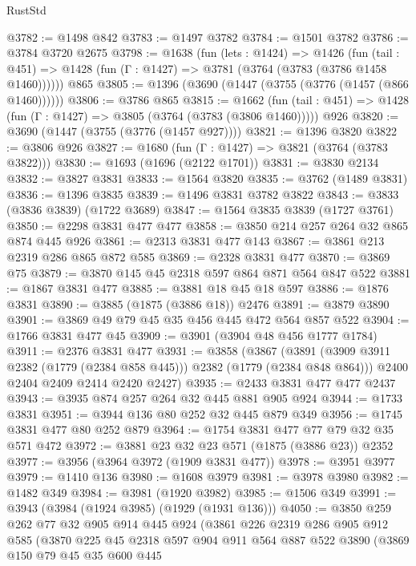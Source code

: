 \begin{lexlean}{RustStd}
\begin{coremodule}
{\begin{coremodule}
{{{{{{{{{{{@3782 := @1498 @842
@3783 := @1497 @3782
@3784 := @1501 @3782
@3786 := @3784 @3720 @2675
@3798 := @1638
    (fun (lets : @1424) =>
    @1426
      (fun (tail : @451) => @1428 (fun (Γ : @1427) => @3781 (@3764 (@3783 (@3786 @1458 @1460))))))
    @865
@3805 := @1396 (@3690 (@1447 (@3755 (@3776 (@1457 (@866 @1460))))))
@3806 := @3786 @865
@3815 := @1662
    (fun (tail : @451) => @1428 (fun (Γ : @1427) => @3805 (@3764 (@3783 (@3806 @1460)))))
    @926
@3820 := @3690 (@1447 (@3755 (@3776 (@1457 @927))))
@3821 := @1396 @3820
@3822 := @3806 @926
@3827 := @1680 (fun (Γ : @1427) => @3821 (@3764 (@3783 @3822)))
@3830 := @1693 (@1696 (@2122 @1701))
@3831 := @3830 @2134
@3832 := @3827 @3831
@3833 := @1564 @3820
@3835 := @3762 (@1489 @3831)
@3836 := @1396 @3835
@3839 := @1496 @3831 @3782 @3822
@3843 := @3833 (@3836 @3839) (@1722 @3689)
@3847 := @1564 @3835 @3839 (@1727 @3761)
@3850 := @2298 @3831 @477 @477
@3858 := @3850 @214 @257 @264 @32 @865 @874 @445 @926
@3861 := @2313 @3831 @477 @143
@3867 := @3861 @213 @2319 @286 @865 @872 @585
@3869 := @2328 @3831 @477
@3870 := @3869 @75
@3879 := @3870 @145 @45 @2318 @597 @864 @871 @564 @847 @522
@3881 := @1867 @3831 @477
@3885 := @3881 @18 @45 @18 @597
@3886 := @1876 @3831
@3890 := @3885 (@1875 (@3886 @18)) @2476
@3891 := @3879 @3890
@3901 := @3869 @49 @79 @45 @35 @456 @445 @472 @564 @857 @522
@3904 := @1766 @3831 @477 @45
@3909 := @3901 (@3904 @48 @456 @1777 @1784)
@3911 := @2376 @3831 @477
@3931 := @3858
    (@3867
      (@3891 (@3909 @3911 @2382 (@1779 (@2384 @858 @445))) @2382 (@1779 (@2384 @848 @864)))
      @2400
      @2404
      @2409
      @2414
      @2420
      @2427)
@3935 := @2433 @3831 @477 @477 @2437
@3943 := @3935 @874 @257 @264 @32 @445 @881 @905 @924
@3944 := @1733 @3831
@3951 := @3944 @136 @80 @252 @32 @445 @879 @349
@3956 := @1745 @3831 @477 @80 @252 @879
@3964 := @1754 @3831 @477 @77 @79 @32 @35 @571 @472
@3972 := @3881 @23 @32 @23 @571 (@1875 (@3886 @23)) @2352
@3977 := @3956 (@3964 @3972 (@1909 @3831 @477))
@3978 := @3951 @3977
@3979 := @1410 @136
@3980 := @1608 @3979
@3981 := @3978 @3980
@3982 := @1482 @349
@3984 := @3981 (@1920 @3982)
@3985 := @1506 @349
@3991 := @3943 (@3984 (@1924 @3985) (@1929 (@1931 @136)))
@4050 := @3850
    @259
    @262
    @77
    @32
    @905
    @914
    @445
    @924
    (@3861
      @226
      @2319
      @286
      @905
      @912
      @585
      (@3870
        @225
        @45
        @2318
        @597
        @904
        @911
        @564
        @887
        @522
        @3890
        (@3869
          @150
          @79
          @45
          @35
          @600
          @445
}}}}}}}}}}}
\end{coremodule}}
\end{coremodule}
\end{lexlean}
